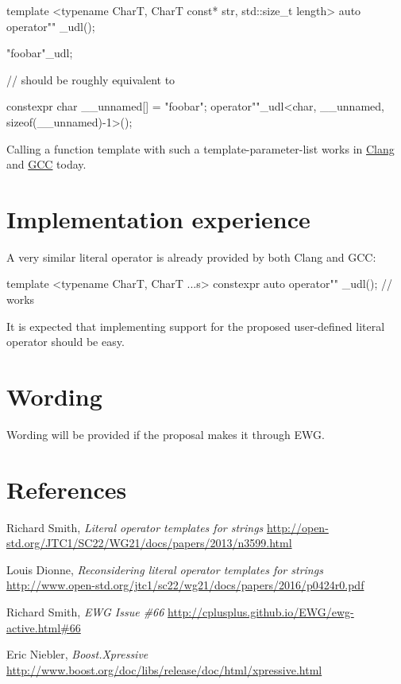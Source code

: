 \documentclass{wg21}
\begin{document}
\begin{cpp}
template <typename CharT, CharT const* str, std::size_t length>
auto operator"" _udl();

"foobar"_udl;

// should be roughly equivalent to

constexpr char __unnamed[] = "foobar";
operator""_udl<char, __unnamed, sizeof(__unnamed)-1>();
\end{cpp}

Calling a function template with such a template-parameter-list works in
\href{https://wandbox.org/permlink/RBV6abYfNee94wlW}{Clang} and
\href{https://wandbox.org/permlink/rZEY8vDB5mHMPmmd}{GCC} today.


\section{Implementation experience}
A very similar literal operator is already provided by both Clang and GCC:

\begin{cpp}
  template <typename CharT, CharT ...s>
  constexpr auto operator"" _udl(); // works
\end{cpp}

It is expected that implementing support for the proposed user-defined literal
operator should be easy.


\section{Wording}
Wording will be provided if the proposal makes it through EWG.


\section{References}
\renewcommand{\section}[2]{}%
\begin{thebibliography}{9}

    Richard Smith,
    \emph{Literal operator templates for strings}\newline
    \url{http://open-std.org/JTC1/SC22/WG21/docs/papers/2013/n3599.html}

    Louis Dionne,
    \emph{Reconsidering literal operator templates for strings}\newline
    \url{http://www.open-std.org/jtc1/sc22/wg21/docs/papers/2016/p0424r0.pdf}

    Richard Smith,
    \emph{EWG Issue \#66}\newline
    \url{http://cplusplus.github.io/EWG/ewg-active.html#66}

    Eric Niebler,
    \emph{Boost.Xpressive}\newline
    \url{http://www.boost.org/doc/libs/release/doc/html/xpressive.html}

\end{thebibliography}
\end{document}

